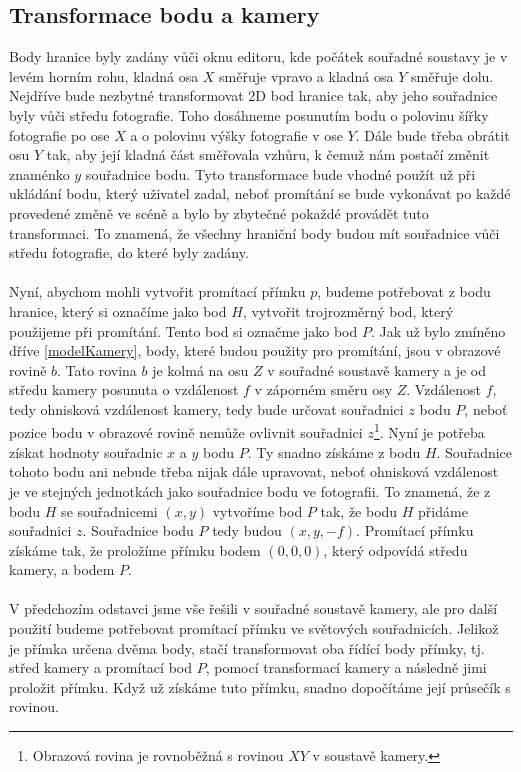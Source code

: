 \documentclass[11pt,twoside,a4paper]{book}
\begin{document}
\subsection{Transformace bodu a kamery}
\label{promitnuti}
Body hranice byly zadány vůči oknu editoru, kde počátek souřadné soustavy je v levém horním rohu, kladná osa $X$ směřuje vpravo a kladná osa $Y$ směřuje dolu. Nejdříve bude nezbytné transformovat 2D bod hranice tak, aby jeho souřadnice byly vůči středu fotografie. Toho dosáhneme posunutím bodu o polovinu šířky fotografie po ose $X$ a o polovinu výšky fotografie v ose $Y$. Dále bude třeba obrátit osu $Y$ tak, aby její kladná část směřovala vzhůru, k čemuž nám postačí změnit znaménko $y$ souřadnice bodu. Tyto transformace bude vhodné použít už při ukládání bodu, který uživatel zadal, neboť promítání se bude vykonávat po každé provedené změně ve scéně a bylo by zbytečné pokaždé provádět tuto transformaci. To znamená, že všechny hraniční body budou mít souřadnice vůči středu fotografie, do které byly zadány.
\paragraph{}
Nyní, abychom mohli vytvořit promítací přímku $p$, budeme potřebovat z bodu hranice, který si označíme jako bod $H$, vytvořit trojrozměrný bod, který použijeme při promítání. Tento bod si označme jako bod $P$. Jak už bylo zmíněno dříve \ref{modelKamery}, body, které budou použity pro promítání, jsou v obrazové rovině $b$. Tato rovina $b$ je kolmá na osu $Z$ v souřadné soustavě kamery a je od středu kamery posunuta o vzdálenost $f$ v záporném směru osy $Z$. Vzdálenost $f$, tedy ohnisková vzdálenost kamery, tedy bude určovat souřadnici $z$ bodu $P$, neboť pozice bodu v obrazové rovině nemůže ovlivnit souřadnici $z$\footnote{Obrazová rovina je rovnoběžná s rovinou $XY$ v soustavě kamery.}. Nyní je potřeba získat hodnoty souřadnic $x$ a $y$ bodu $P$. Ty snadno získáme z bodu $H$. Souřadnice tohoto bodu ani nebude třeba nijak dále upravovat, neboť ohnisková vzdálenost je ve stejných jednotkách jako souřadnice bodu ve fotografii. To znamená, že z bodu $H$ se souřadnicemi $(x, y)$ vytvoříme bod $P$ tak, že bodu $H$ přidáme souřadnici $z$. Souřadnice bodu $P$ tedy budou $(x, y, -f)$. Promítací přímku získáme tak, že proložíme přímku bodem $(0, 0, 0)$, který odpovídá středu kamery, a bodem $P$.
\paragraph{}
V předchozím odstavci jsme vše řešili v souřadné soustavě kamery, ale pro další použití budeme potřebovat promítací přímku ve světových souřadnicích. Jelikož je přímka určena dvěma body, stačí transformovat oba řídící body přímky, tj. střed kamery a promítací bod $P$, pomocí transformací kamery a následně jimi proložit přímku. Když už získáme tuto přímku, snadno dopočítáme její průsečík s rovinou.
\end{document}
